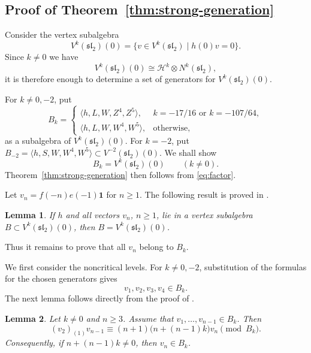 \documentclass[11 pt]{amsart}
\newtheorem{lemma}{Lemma}
\theoremstyle{definition}
\theoremstyle{plain}
\newcommand{\one}{\mathbf 1}
\begin{document}
\subsection{Proof of Theorem~\ref{thm:strong-generation}}

Consider the vertex  subalgebra
\[
V^k(\mathfrak{sl}_2)(0)
=\{v\in V^k(\mathfrak{sl}_2)\mid h(0)v=0\}.
\]
Since  $k\neq0$ we have
\begin{equation}\label{eq:factor}
V^k(\mathfrak{sl}_2)(0)\cong
\mathcal H^k\otimes N^k(\mathfrak{sl}_2),
\end{equation}
it  is therefore enough to determine a set of generators for
$V^k(\mathfrak{sl}_2)(0)$.

For $k\neq0,-2$, put
\[
B_k=
\begin{cases}
\langle h,L,W,Z^4,Z^5\rangle, & k=-17/16\text{ or }k=-107/64,\\
\langle h,L,W,W^4,W^5\rangle, & \text{otherwise},
\end{cases}
\]
as a subalgebra of $V^k(\mathfrak{sl}_2)(0)$.  For $k=-2$, put
$B_{-2}=\langle h,S,W,W^4,W^5\rangle
\subset V^{-2}(\mathfrak{sl}_2)(0)$.
We shall show
\begin{equation}\label{eq:B-equals-zerocharge}
B_k=V^k(\mathfrak{sl}_2)(0)\qquad(k\neq0).
\end{equation}
Theorem~\ref{thm:strong-generation} then follows from \eqref{eq:factor}.

Let $v_n=f(-n)e(-1)\one$ for $n\geq1$.
The following result is proved in \cite[Theorem~2.1]{DLWY}.

\begin{lemma}\label{lem:pbw-reduction}
If $h$ and all vectors $v_n$, $n\geq1$, lie in a vertex subalgebra
$B\subset V^k(\mathfrak{sl}_2)(0)$, then $B=V^k(\mathfrak{sl}_2)(0)$.
\end{lemma}

Thus it remains to prove that all $v_n$ belong to $B_k$.

We first consider the noncritical levels. For $k\neq0,-2$, substitution
of the formulas for the chosen generators gives
\begin{equation}\label{eq:initial-noncrit}
v_1,v_2,v_3,v_4\in B_k.
\end{equation}
The next lemma follows directly from the proof of \cite[Theorem~2.1]{DLWY}.

\begin{lemma}\label{lem:main-induction}
Let $k\neq0$ and $n\geq3$. Assume that
$v_1,\ldots,v_{n-1}\in B_k$. Then
\begin{equation}
 (v_2)_{(1)}v_{n-1}
 \equiv (n+1)\bigl(n+(n-1)k\bigr)v_n\pmod{B_k}.  \label{eq:C2}
\end{equation}
Consequently, if $n+(n-1)k\neq0$, then $v_n\in B_k$.
\end{lemma}
\end{document}
